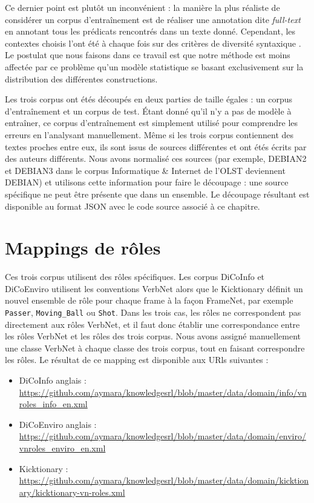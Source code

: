 Ce dernier point est plutôt un inconvénient : la manière la plus réaliste de
considérer un corpus d'entraînement est de réaliser une annotation dite
\textit{full-text} en annotant tous les prédicats rencontrés dans un texte
donné. Cependant, les contextes choisis l'ont été à chaque fois sur des
critères de diversité syntaxique
\citep{schmidt2006interfacing,lhomme2012adding}. Le postulat que nous faisons
dans ce travail est que notre méthode est moins affectée par ce problème qu'un
modèle statistique se basant exclusivement sur la distribution des différentes
constructions.

Les trois corpus ont étés découpés en deux parties de taille égales : un corpus
d'entraînement et un corpus de test. Étant donné qu'il n'y a pas de modèle à
entraîner, ce corpus d'entraînement est simplement utilisé pour comprendre les
erreurs en l'analysant manuellement. Même si les trois corpus contiennent des
textes proches entre eux, ils sont issus de sources différentes et ont étés
écrits par des auteurs différents. Nous avons normalisé ces sources (par
exemple, DEBIAN2 et DEBIAN3 dans le corpus Informatique \& Internet de l'OLST
deviennent DEBIAN) et utilisons cette information pour faire le découpage : une
source spécifique ne peut être présente que dans un ensemble. Le découpage
résultant est disponible au format JSON avec le code source associé à ce
chapitre.

\section{Mappings de rôles}

Ces trois corpus utilisent des rôles spécifiques. Les corpus DiCoInfo et
DiCoEnviro utilisent les conventions VerbNet alors que le Kicktionary  définit
un nouvel ensemble de rôle pour chaque frame à la façon FrameNet, par exemple
\texttt{Passer}, \texttt{Moving\_Ball} ou \texttt{Shot}. Dans les trois cas,
les rôles ne correspondent pas directement aux rôles VerbNet, et il faut donc
établir une correspondance entre les rôles VerbNet et les rôles des trois
corpus.  Nous avons assigné manuellement une classe VerbNet à chaque classe des
trois corpus, tout en faisant correspondre les rôles. Le résultat de ce mapping
est disponible aux URls suivantes :

\begin{itemize}
    \item DiCoInfo anglais : \url{https://github.com/aymara/knowledgesrl/blob/master/data/domain/info/vnroles_info_en.xml}
    \item DiCoEnviro anglais : \url{https://github.com/aymara/knowledgesrl/blob/master/data/domain/enviro/vnroles_enviro_en.xml}
    \item Kicktionary : \url{https://github.com/aymara/knowledgesrl/blob/master/data/domain/kicktionary/kicktionary-vn-roles.xml}
\end{itemize}

